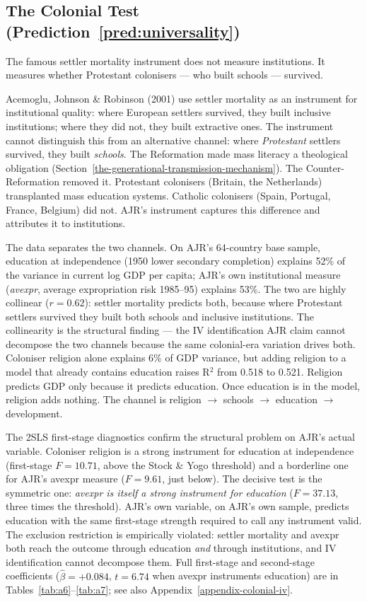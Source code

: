 \documentclass[12pt,letterpaper]{article}
\begin{document}
\subsection{The Colonial Test (Prediction~\ref{pred:universality})}\label{the-colonial-test}

The famous settler mortality instrument does not measure institutions. It measures whether Protestant colonisers --- who built schools --- survived.

Acemoglu, Johnson \& Robinson (2001) use settler mortality as an
instrument for institutional quality: where European settlers survived,
they built inclusive institutions; where they did not, they built
extractive ones. The instrument cannot distinguish this from an
alternative channel: where \emph{Protestant} settlers survived, they
built \emph{schools}. The Reformation made mass literacy a theological
obligation (Section~\ref{the-generational-transmission-mechanism}). The Counter-Reformation removed it. Protestant
colonisers (Britain, the Netherlands) transplanted mass education
systems. Catholic colonisers (Spain, Portugal, France, Belgium) did not.
AJR's instrument captures this difference and attributes it to
institutions.

The data separates the two channels. On AJR's 64-country base sample,
education at independence (1950 lower secondary completion) explains
52\% of the variance in current log GDP per capita; AJR's own
institutional measure (\emph{avexpr}, average expropriation risk
1985--95) explains 53\%. The two are highly collinear ($r = 0.62$):
settler mortality predicts both, because where Protestant settlers
survived they built both schools and inclusive institutions. The
collinearity is the structural finding --- the IV identification AJR
claim cannot decompose the two channels because the same colonial-era
variation drives both. Coloniser religion alone explains 6\% of GDP
variance, but adding religion to a model that already contains
education raises R$^2$ from 0.518 to 0.521. Religion predicts GDP only
because it predicts education. Once education is in the model,
religion adds nothing. The channel is religion $\to$ schools $\to$
education $\to$ development.

The 2SLS first-stage diagnostics confirm the structural problem on
AJR's actual variable. Coloniser religion is a strong instrument for
education at independence (first-stage $F=10.71$, above the Stock \&
Yogo threshold) and a borderline one for AJR's avexpr measure
($F=9.61$, just below). The decisive test is the symmetric one:
\emph{avexpr is itself a strong instrument for education}
($F=37.13$, three times the threshold). AJR's own variable, on AJR's
own sample, predicts education with the same first-stage strength
required to call any instrument valid. The exclusion restriction is
empirically violated: settler mortality and avexpr both reach the
outcome through education \emph{and} through institutions, and IV
identification cannot decompose them. Full first-stage and
second-stage coefficients ($\hat\beta=+0.084$, $t=6.74$ when avexpr
instruments education) are in Tables~\ref{tab:a6}--\ref{tab:a7}; see
also Appendix~\ref{appendix-colonial-iv}.
\end{document}
